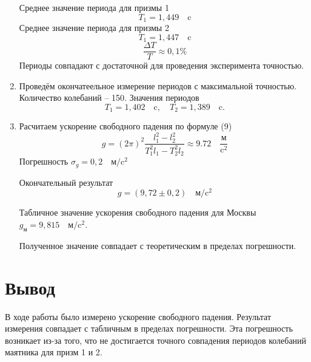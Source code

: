 \documentclass[a4paper,12 pt]{article}
\begin{document}
\begin{enumerate}
    Среднее значение периода для призмы 1 
    \begin{displaymath}
        T_1 = 1,449 \quad \text{c}
    \end{displaymath}
    Среднее значение периода для призмы 2 
    \begin{displaymath}
        T_1 = 1,447 \quad \text{c}
    \end{displaymath}
    \begin{displaymath}
        \frac{\Delta T}{T} \approx 0,1 \%
    \end{displaymath}
    Периоды совпадают с достаточной для проведения эксперимента точностью.
    \item Проведём окончатеельное измерение периодов с максимальной точностью. Количество колебаний -- 150. Значения периодов
    \begin{displaymath}
        T_1 = 1,402 \quad \text{c}, \quad T_2 = 1,389 \quad \text{c}.
    \end{displaymath}
    \item Расчитаем ускорение свободного падения по формуле (9)
    \begin{displaymath}
        g = (2\pi)^2 \frac{l_1^2-l_2^2}{T_1^2l_1-T_2^2l_2} \approx 9.72 \quad \frac{\text{м}}{\text{c}^2}
    \end{displaymath}
    Погрешность $\sigma_g = 0,2 \quad \text{м} / \text{c}^2$

    Окончательный результат 
    \begin{displaymath}
        g = ( 9,72 \pm 0,2 ) \quad \text{м} / \text{c}^2
    \end{displaymath}

    Табличное значение ускорения свободного падения для Москвы $g_{\text{м}} = 9,815 \quad \text{м} / \text{c}^2$.

    Полученное значение совпадает с теоретическим в пределах погрешности. 
\end{enumerate}

\section{Вывод}

В ходе работы было измерено ускорение свободного падения. Результат измерения совпадает с табличным в пределах погрешности. Эта погрешность возникает из-за того, что не достигается точного совпадения периодов колебаний маятника для призм 1 и 2.
\end{document}
